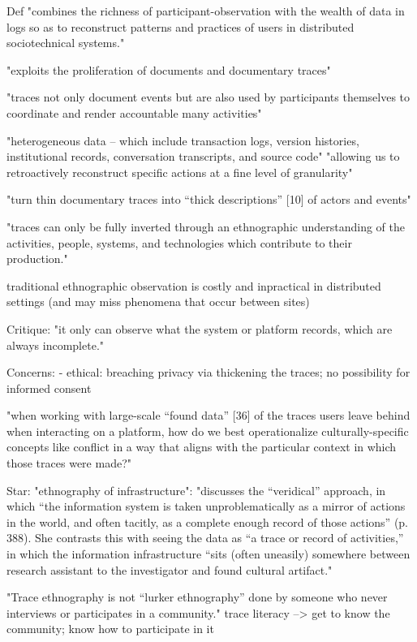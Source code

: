 \documentclass{sigchi}
\begin{document}
Def
"combines the richness of participant-observation
with the wealth of data in logs so as to reconstruct
patterns and practices of users in distributed
sociotechnical systems."

"exploits the proliferation of
documents and documentary traces"

"traces not only
document events but are also used by participants
themselves to coordinate and render accountable many
activities"

"heterogeneous data – which include transaction logs,
version histories, institutional records, conversation
transcripts, and source code"
"allowing us to retroactively reconstruct specific actions
at a fine level of granularity"

"turn thin documentary traces into
“thick descriptions” [10] of actors and events"

"traces can only
be fully inverted through an ethnographic
understanding of the activities, people, systems, and
technologies which contribute to their production."

traditional ethnographic observation is costly and inpractical in distributed settings (and may miss phenomena that occur between sites)

Critique:
"it only can observe what the system
or platform records, which are always incomplete."

Concerns:
- ethical: breaching privacy via thickening the traces; no possibility for informed consent

\cite{GeiHal2017}
"when working with large-scale “found data” [36] of the traces
users leave behind when interacting on a platform, how do we best operationalize culturally-specific
concepts like conflict in a way that aligns with the particular context in which those traces were made?"

Star: "ethnography of infrastructure":
"discusses the “veridical” approach, in which “the information system
is taken unproblematically as a mirror of actions in the world, and often tacitly, as a complete
enough record of those actions” (p. 388).
She contrasts this with seeing the data as “a trace or record
of activities,” in which the information infrastructure “sits (often uneasily) somewhere between
research assistant to the investigator and found cultural artifact."

"Trace
ethnography is not “lurker ethnography” done by someone who never interviews or participates in
a community."
trace literacy --> get to know the community; know how to participate in it
\end{document}
